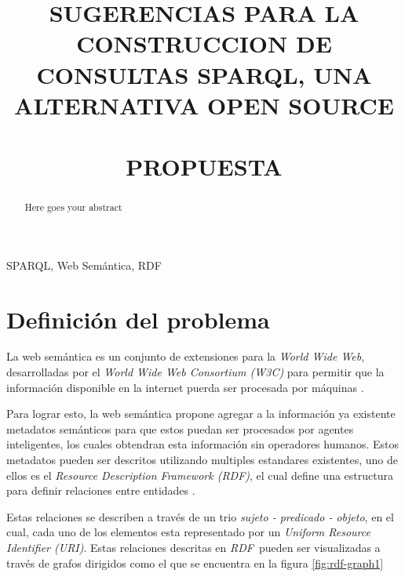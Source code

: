 \documentclass[conference,compsoc]{IEEEtran}
\newcommand{\rdf}{\textit{RDF}\ }
\begin{document}
\title{SUGERENCIAS PARA LA CONSTRUCCION DE CONSULTAS SPARQL, UNA ALTERNATIVA OPEN SOURCE\\ \ \\PROPUESTA}

\author{
}

\maketitle

\IEEEpubidadjcol

\begin{abstract}
    Here goes your abstract
\end{abstract}

\begin{IEEEkeywords}
    SPARQL, Web Semántica, RDF
\end{IEEEkeywords}

\IEEEpeerreviewmaketitle

\section{Definición del problema}

La web semántica es un conjunto de extensiones para la \textit{World Wide Web},
desarrolladas por el \textit{World Wide Web Consortium (W3C)} para permitir que
la información disponible en la internet puerda ser procesada por máquinas \cite{berners2001semantic}.

Para lograr esto, la web semántica propone agregar a la información ya existente
metadatos semánticos para que estos puedan ser procesados por agentes inteligentes,
los cuales obtendran esta información sin operadores humanos. Estos metadatos pueden
ser descritos utilizando multiples estandares existentes, uno de ellos es el 
\textit{Resource Description Framework (RDF)}, el cual define una estructura para
definir relaciones entre entidades \cite{world2014rdf}.

Estas relaciones se describen a través de un trio \textit{sujeto - predicado - objeto},
en el cual, cada uno de los elementos esta representado por un \textit{Uniform Resource Identifier (URI)}.
Estas relaciones descritas en \rdf pueden ser visualizadas a través de grafos dirigidos como
el que se encuentra en la figura \ref{fig:rdf-graph1}
\end{document}
